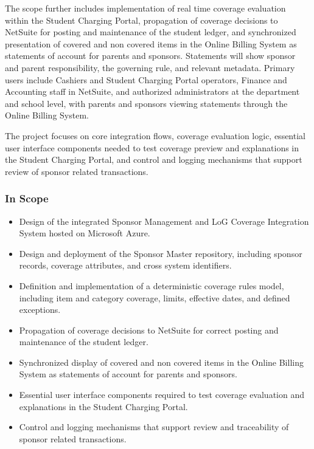 \documentclass[12pt,a4paper]{article}
\begin{document}
The scope further includes implementation of real time coverage evaluation within the Student Charging Portal, propagation of coverage decisions to NetSuite for posting and maintenance of the student ledger, and synchronized presentation of covered and non covered items in the Online Billing System as statements of account for parents and sponsors. Statements will show sponsor and parent responsibility, the governing rule, and relevant metadata. Primary users include Cashiers and Student Charging Portal operators, Finance and Accounting staff in NetSuite, and authorized administrators at the department and school level, with parents and sponsors viewing statements through the Online Billing System.

The project focuses on core integration flows, coverage evaluation logic, essential user interface components needed to test coverage preview and explanations in the Student Charging Portal, and control and logging mechanisms that support review of sponsor related transactions.

\subsubsection{In Scope}
\begin{itemize}
  \item Design of the integrated Sponsor Management and LoG Coverage Integration System hosted on Microsoft Azure.
  \item Design and deployment of the Sponsor Master repository, including sponsor records, coverage attributes, and cross system identifiers.
  \item Definition and implementation of a deterministic coverage rules model, including item and category coverage, limits, effective dates, and defined exceptions.
  \item Propagation of coverage decisions to NetSuite for correct posting and maintenance of the student ledger.
  \item Synchronized display of covered and non covered items in the Online Billing System as statements of account for parents and sponsors.
  \item Essential user interface components required to test coverage evaluation and explanations in the Student Charging Portal.
  \item Control and logging mechanisms that support review and traceability of sponsor related transactions.
\end{itemize}
\end{document}
